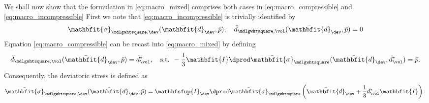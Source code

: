 \documentclass[a4paper,11pt]{article}
\renewcommand{\ts}[1]{\mathbfit{#1}}
\renewcommand{\tf}[1]{\mathbfsfup{#1}}
\renewcommand{\Box}{\mdlgwhtsquare}
\begin{document}
We shall now show that the formulation in \eqref{eq:macro_mixed} comprises both cases in \eqref{eq:macro_compressible} and \eqref{eq:macro_incompressible}
First we note that \eqref{eq:macro_incompressible} is trivially identified by 
\begin{align}
 \bar{\ts\sigma}_{\Box,\dev}(\bar{\ts d}_\dev, \bar p), \quad \bar{d}_{\Box,\vol}(\bar{\ts d}_\dev,\bar p) = 0
\end{align}
Equation \eqref{eq:macro_compressible} can be recast into \eqref{eq:macro_mixed} by defining
\begin{align}
 \bar d_{\Box,\vol}(\bar{\ts d}_\dev, \bar p) = \bar{d}_\vol^*,\quad \text{s.t. } -\frac13 \ts I\dprod \bar{\ts\sigma}_\Box(\bar{\ts d}_\dev, \bar{d}_\vol^*) = \bar p.
\end{align}
Consequently, the deviatoric stress is defined as
\begin{align}
 \bar{\ts\sigma}_{\Box,\dev}(\bar{\ts d}_\dev,\bar p) = \tf I_\dev \dprod \bar{\ts\sigma}_\Box\left(\bar{\ts d}_\dev + \frac13 \bar{d}_\vol^*\ts I\right).
\end{align}
\end{document}
